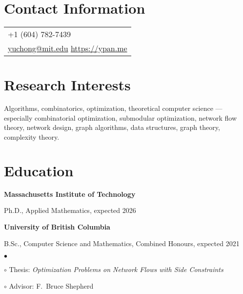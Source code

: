 \documentclass[margin,line]{res}
\newenvironment{list1}{
  \begin{list}{\ding{113}}{%
      \setlength{\itemsep}{0in}
      \setlength{\parsep}{0.025in} \setlength{\parskip}{0in}
      \setlength{\topsep}{0in} \setlength{\partopsep}{0in}
      \setlength{\leftmargin}{0.17in}}}{\end{list}}
\newenvironment{list2}{
  \begin{list}{$\bullet$}{%
      \setlength{\itemsep}{0in}
      \setlength{\parsep}{0in} \setlength{\parskip}{0in}
      \setlength{\topsep}{0in} \setlength{\partopsep}{0in}
      \setlength{\leftmargin}{0.2in}}}{\end{list}}
\begin{document}

\begin{resume}

\section{\sc Contact Information}

\vspace{.05in}
\begin{tabular}{p{2in}}
+1 (604) 782-7439 \\
\href{mailto:yuchong@mit.edu}{yuchong@mit.edu}
\href{https://ypan.me/}{https://ypan.me}
\end{tabular}


\section{\sc Research Interests}
Algorithms, combinatorics, optimization, theoretical computer science --- especially combinatorial optimization, submodular optimization, network flow theory, network design, graph algorithms, data structures, graph theory, complexity theory.

\section{\sc Education}

{\bf Massachusetts Institute of Technology} \\
\vspace*{-.1in}
\begin{list1}
\item[] Ph.D., Applied Mathematics, expected 2026
\end{list1}

{\bf University of British Columbia}\\
\vspace*{-.1in}
\begin{list1}
\item[] B.Sc., Computer Science and Mathematics, Combined Honours, expected 2021
  \begin{list2}
  \item[$\circ$] Thesis: \emph{Optimization Problems on Network Flows with Side Constraints}
  \item[$\circ$] Advisor: F.\ Bruce Shepherd
  \end{list2}
\end{list1}



\end{resume}
\end{document}
